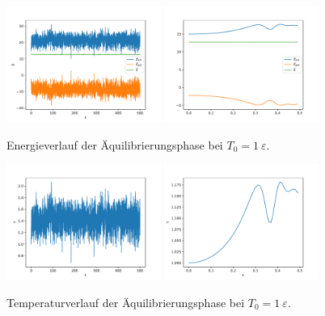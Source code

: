 \begin{figure}
    \centering
    \includegraphics[width=0.45\textwidth]{A1/build/aequi1_E.pdf}
    \includegraphics[width=0.45\textwidth]{A1/build/aequi1_EE.pdf}
    \caption{Energieverlauf der Äquilibrierungsphase bei $T_0 = 1\:\varepsilon$.}
    \label{fig:e1}
\end{figure}

\begin{figure}
    \centering
    \includegraphics[width=0.45\textwidth]{A1/build/aequi1_T.pdf}
    \includegraphics[width=0.45\textwidth]{A1/build/aequi1_TT.pdf}
    \caption{Temperaturverlauf der Äquilibrierungsphase bei $T_\text{0} = 1\:\varepsilon$.}
    \label{fig:T1}
\end{figure}

